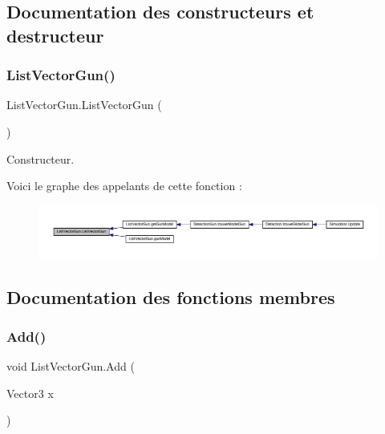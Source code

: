 \subsection{Documentation des constructeurs et destructeur}
\mbox{\label{class_list_vector_gun_a9f370c4f677db9d3ecb750febcaed21e}} 
\subsubsection{\texorpdfstring{List\+Vector\+Gun()}{ListVectorGun()}}
{\footnotesize\ttfamily List\+Vector\+Gun.\+List\+Vector\+Gun (\begin{DoxyParamCaption}{ }\end{DoxyParamCaption})\hspace{0.3cm}{\ttfamily [inline]}}



Constructeur. 

Voici le graphe des appelants de cette fonction \+:
\nopagebreak
\begin{figure}[H]
\begin{center}
\leavevmode
\includegraphics[width=350pt]{class_list_vector_gun_a9f370c4f677db9d3ecb750febcaed21e_icgraph}
\end{center}
\end{figure}


\subsection{Documentation des fonctions membres}
\mbox{\label{class_list_vector_gun_a2969c469590b46d382af86ffbffe46c4}} 
\subsubsection{\texorpdfstring{Add()}{Add()}}
{\footnotesize\ttfamily void List\+Vector\+Gun.\+Add (\begin{DoxyParamCaption}\item[{Vector3}]{x }\end{DoxyParamCaption})\hspace{0.3cm}{\ttfamily [inline]}}



